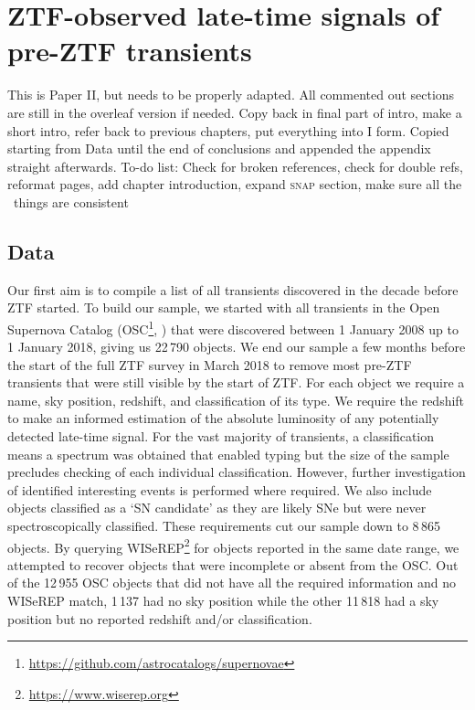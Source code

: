\documentclass[a4paper,oneside,12pt, class=Latex/Classes/PhDthesisPSnPDF, crop=false]{standalone}
\begin{document}
\doublespacing
\chapter{ZTF-observed late-time signals of pre-ZTF transients}
\label{chap:pre-ZTF_search}


\color{red} This is Paper II, but needs to be properly adapted. All commented out sections are still in the overleaf version if needed. Copy back in final part of intro, make a short intro, refer back to previous chapters, put everything into I form. Copied starting from Data until the end of conclusions and appended the appendix straight afterwards. To-do list: Check for broken references, check for double refs, reformat pages, add chapter introduction, expand \textsc{snap} section, make sure all the \ztfg\ztfr\ztfi\ things are consistent\color{black}


\section{Data}
\label{Pre-ZTF_data}
Our first aim is to compile a list of all transients discovered in the decade before ZTF started. To build our sample, we started with all transients in the Open Supernova Catalog (OSC\footnote{\url{https://github.com/astrocatalogs/supernovae}}, \citealt{Open_SN_cat}) that were discovered between 1 January 2008 up to 1 January 2018, giving us 22\,790 objects. We end our sample a few months before the start of the full ZTF survey in March 2018 to remove most pre-ZTF transients that were still visible by the start of ZTF. For each object we require a name, sky position, redshift, and classification of its type. We require the redshift to make an informed estimation of the absolute luminosity of any potentially detected late-time signal. For the vast majority of transients, a classification means a spectrum was obtained that enabled typing but the size of the sample precludes checking of each individual classification. However, further investigation of identified interesting events is performed where required. We also include objects classified as a `SN candidate' as they are likely SNe but were never spectroscopically classified. These requirements cut our sample down to 8\,865 objects. By querying WISeREP\footnote{\url{https://www.wiserep.org}} \citep{wiserep} for objects reported in the same date range, we attempted to recover objects that were incomplete or absent from the OSC. Out of the 12\,955 OSC objects that did not have all the required information and no WISeREP match, 1\,137 had no sky position while the other 11\,818 had a sky position but no reported redshift and/or classification.
\end{document}
